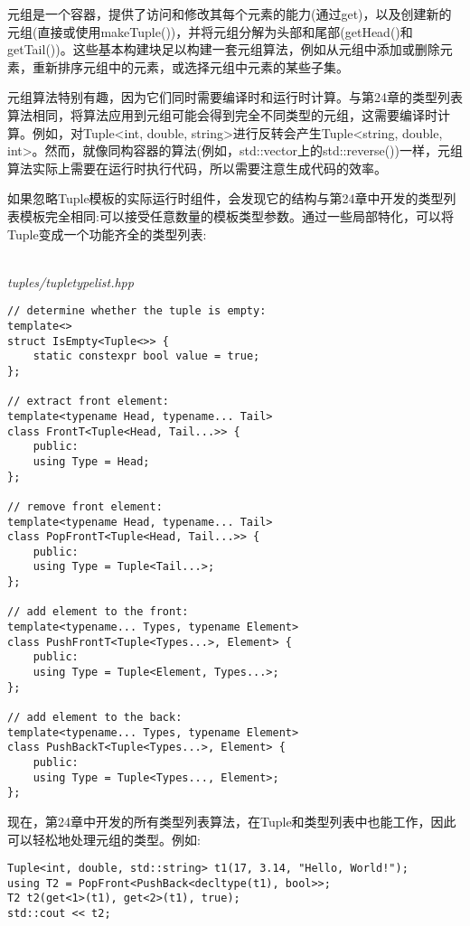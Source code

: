 
元组是一个容器，提供了访问和修改其每个元素的能力(通过get)，以及创建新的元组(直接或使用makeTuple())，并将元组分解为头部和尾部(getHead()和getTail())。这些基本构建块足以构建一套元组算法，例如从元组中添加或删除元素，重新排序元组中的元素，或选择元组中元素的某些子集。

元组算法特别有趣，因为它们同时需要编译时和运行时计算。与第24章的类型列表算法相同，将算法应用到元组可能会得到完全不同类型的元组，这需要编译时计算。例如，对Tuple<int, double, string>进行反转会产生Tuple<string, double, int>。然而，就像同构容器的算法(例如，std::vector上的std::reverse())一样，元组算法实际上需要在运行时执行代码，所以需要注意生成代码的效率。


如果忽略Tuple模板的实际运行时组件，会发现它的结构与第24章中开发的类型列表模板完全相同:可以接受任意数量的模板类型参数。通过一些局部特化，可以将Tuple变成一个功能齐全的类型列表:

\hspace*{\fill} \\ %
\noindent
\textit{tuples/tupletypelist.hpp}
\begin{lstlisting}[style=styleCXX]
// determine whether the tuple is empty:
template<>
struct IsEmpty<Tuple<>> {
	static constexpr bool value = true;
};

// extract front element:
template<typename Head, typename... Tail>
class FrontT<Tuple<Head, Tail...>> {
	public:
	using Type = Head;
};

// remove front element:
template<typename Head, typename... Tail>
class PopFrontT<Tuple<Head, Tail...>> {
	public:
	using Type = Tuple<Tail...>;
};

// add element to the front:
template<typename... Types, typename Element>
class PushFrontT<Tuple<Types...>, Element> {
	public:
	using Type = Tuple<Element, Types...>;
};

// add element to the back:
template<typename... Types, typename Element>
class PushBackT<Tuple<Types...>, Element> {
	public:
	using Type = Tuple<Types..., Element>;
};
\end{lstlisting}

现在，第24章中开发的所有类型列表算法，在Tuple和类型列表中也能工作，因此可以轻松地处理元组的类型。例如:

\begin{lstlisting}[style=styleCXX]
Tuple<int, double, std::string> t1(17, 3.14, "Hello, World!");
using T2 = PopFront<PushBack<decltype(t1), bool>>;
T2 t2(get<1>(t1), get<2>(t1), true);
std::cout << t2;
\end{lstlisting}

